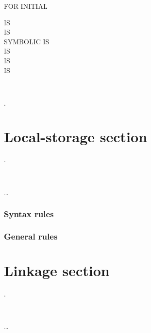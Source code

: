 \begin{syntax}[\deletedcolour]
    FOR INITIAL 
  \begin{0-1}
    \begin{1+}
        IS \identifier \\
        IS \identifier \\
      SYMBOLIC  IS \identifier \\
        IS \identifier \\
        IS \identifier \\
        IS \identifier
    \end{1+} \\

    \identifier \identifier \identifier \identifier \identifier \identifier
  \end{0-1}
  .
\end{syntax}

\section{Local-storage section}
\begin{syntax}
   .\newline
  \begin{0-1}
     \\
  \end{0-1}\ldots
\end{syntax}

\subsubsection{Syntax rules}

\subsubsection{General rules}

\section{Linkage section}
\begin{syntax}
   .\newline
  \begin{0-1}
     \\
  \end{0-1}\ldots
\end{syntax}

